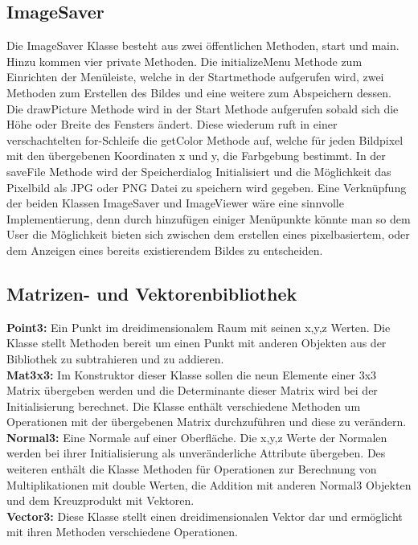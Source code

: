 \documentclass[14pt]{extarticle}
\begin{document}
\subsection{ImageSaver}
Die ImageSaver Klasse besteht aus zwei öffentlichen Methoden, start und main. 
Hinzu kommen vier private Methoden. Die initializeMenu Methode zum Einrichten der Menüleiste, welche in der Startmethode aufgerufen wird, zwei Methoden zum Erstellen des Bildes und eine weitere zum Abspeichern dessen. 
\newline
Die drawPicture Methode wird in der Start Methode aufgerufen sobald sich die Höhe oder Breite des Fensters ändert. Diese wiederum ruft in einer verschachtelten for-Schleife die getColor Methode auf, welche für jeden Bildpixel mit den übergebenen Koordinaten x und y, die Farbgebung bestimmt. 
\newline
In der saveFile Methode wird der Speicherdialog Initialisiert und die Möglichkeit das Pixelbild als JPG oder PNG Datei zu speichern wird gegeben. 
\newline
Eine Verknüpfung der beiden Klassen ImageSaver und ImageViewer wäre eine sinnvolle Implementierung, denn durch hinzufügen einiger Menüpunkte könnte man so dem User die Möglichkeit bieten sich zwischen dem erstellen eines pixelbasiertem, oder dem Anzeigen eines bereits existierendem Bildes zu entscheiden. 

\subsection{Matrizen- und Vektorenbibliothek}
\textbf{Point3:} Ein Punkt im dreidimensionalem Raum mit seinen x,y,z Werten. Die Klasse stellt Methoden bereit um einen Punkt mit anderen Objekten aus der Bibliothek zu subtrahieren und zu addieren.
\\\textbf{Mat3x3:} Im Konstruktor dieser Klasse sollen die neun Elemente einer 3x3 Matrix übergeben werden und die Determinante dieser Matrix wird bei der Initialisierung berechnet. Die Klasse enthält verschiedene Methoden um Operationen mit der übergebenen Matrix durchzuführen und diese zu verändern. 
\\\textbf{Normal3:} Eine Normale auf einer Oberfläche. Die x,y,z Werte der Normalen werden bei ihrer Initialisierung als unveränderliche Attribute übergeben. Des weiteren enthält die Klasse Methoden für Operationen zur Berechnung von Multiplikationen mit double Werten, die Addition mit anderen Normal3 Objekten und dem Kreuzprodukt mit Vektoren.
\\\textbf{Vector3:} Diese Klasse stellt einen dreidimensionalen Vektor dar und ermöglicht mit ihren Methoden verschiedene Operationen.
\end{document}
